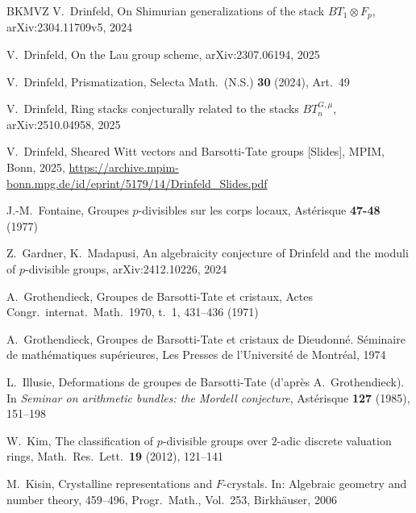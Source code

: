 \documentclass[a4paper,11pt]{amsart}
\theoremstyle{plain}
\theoremstyle{definition}
\theoremstyle{remark}
\numberwithin{equation}{section}
\begin{document}
\begin{thebibliography}{BKMVZ}
V.~Drinfeld, 
On Shimurian generalizations of the stack $BT_1\otimes F_p$,
arXiv:2304.11709v5, 2024

V.~Drinfeld, 
On the Lau group scheme, 
arXiv:2307.06194, 2025 

V.~Drinfeld,
Prismatization,
Selecta Math.\ (N.S.) \textbf{30} (2024), Art.~49

V.~Drinfeld,
Ring stacks conjecturally related to the stacks $BT_n^{G,\mu}$,
arXiv:2510.04958, 2025

V.~Drinfeld,
Sheared Witt vectors and Barsotti-Tate groups [Slides], MPIM, Bonn, 2025, \url{https://archive.mpim-bonn.mpg.de/id/eprint/5179/14/Drinfeld_Slides.pdf}

J.-M.~Fontaine,
Groupes $p$-divisibles sur les corps locaux,
Ast\'erisque {\bf 47-48} (1977)

 
Z.~Gardner, K.~Madapusi, 
An algebraicity conjecture of Drinfeld and the moduli of $p$-divisible groups, arXiv:2412.10226, 2024

A.~Grothendieck,
Groupes de Barsotti-Tate et cristaux,
Actes Congr.\ internat.\ Math.\ 1970, t.~1, 431--436 (1971)

A.~Grothendieck,
Groupes de Barsotti-Tate et cristaux de Dieudonn\'e. 
S\'eminaire de math\'ematiques sup\'erieures,
Les Presses de l'Universit\'e de Montr\'eal, 1974

L.~Illusie,
Deformations de groupes de Barsotti-Tate
(d'apr\`{e}s A.~Grothendieck).
In {\it Seminar on arithmetic bundles: the Mordell conjecture}, 
Ast\'{e}risque {\bf 127} (1985), 151--198 

W.~Kim,
The classification of $p$-divisible groups over $2$-adic discrete valuation rings,
Math.\ Res.\ Lett.\ {\bf  19} (2012), 121--141

M.~Kisin, 
Crystalline representations and $F$-crystals.
In: Algebraic geometry and number theory, 459--496,
Progr.\ Math., Vol.\ 253, Birkh\"auser, 2006


\end{thebibliography}
\end{document}
